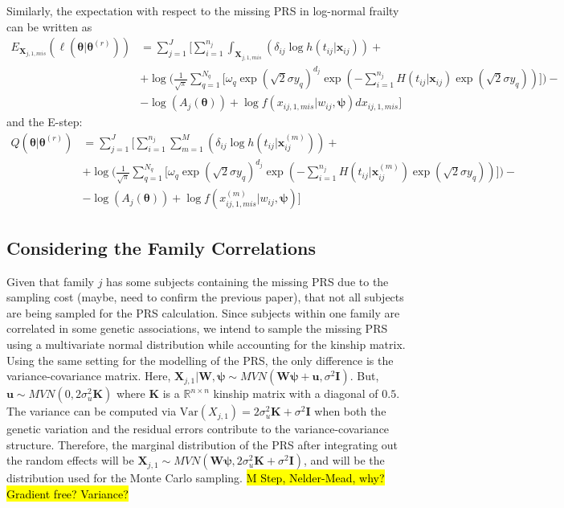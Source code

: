 \documentclass[preprint,12pt]{elsarticle}
\begin{document}
Similarly, the expectation with respect to the missing PRS in log-normal frailty can be written as
\begin{align} 
    E_{\mathbf{X}_{j,1,mis}}(\ell(\boldsymbol{\theta}|\boldsymbol{\theta}^{(r)}))&=\sum_{j=1}^J\Bigg [\sum_{i=1}^{n_j}\int_{\boldsymbol{X}_{j,1,mis}}(\delta_{ij}\log h(t_{ij}|\mathbf{x}_{ij}))+ \\ 
    & + \log\Big (\frac{1}{\sqrt{\pi}}\sum_{q=1}^{N_{q}}\Big [\omega_{q}\exp (\sqrt{2}\sigma y_{q})^{d_j}\exp (-\sum_{i=1}^{n_j}H(t_{ij}|\mathbf{x}_{ij})\exp(\sqrt{2}\sigma y_{q}))\Big]\Big ) - \\
    & - \log(A_j(\boldsymbol{\theta})) + \log f(x_{ij,1,mis}|w_{ij},\boldsymbol{\psi}) dx_{ij,1,mis}\Bigg ]
\end{align}
and the E-step:
\begin{align} 
    Q(\boldsymbol{\theta}|\boldsymbol{\theta}^{(r)}) &= \sum_{j=1}^J\Bigg [\sum_{i=1}^{n_j}\sum_{m=1}^{M}(\delta_{ij}\log h(t_{ij}|\mathbf{x}^{(m)}_{ij}))+ \\ 
    & + \log\Big (\frac{1}{\sqrt{\pi}}\sum_{q=1}^{N_{q}}\Big [\omega_{q}\exp (\sqrt{2}\sigma y_{q})^{d_j}\exp (-\sum_{i=1}^{n_j}H(t_{ij}|\mathbf{x}^{(m)}_{ij})\exp(\sqrt{2}\sigma y_{q}))\Big]\Big ) - \\
    & - \log(A_j(\boldsymbol{\theta})) + \log f(x_{ij,1,mis}^{(m)}|w_{ij},\boldsymbol{\psi})\Bigg ]
\end{align}
\subsection{Considering the Family Correlations}
Given that family $j$ has some subjects containing the missing PRS due to the sampling cost (maybe, need to confirm the previous paper), that not all subjects are being sampled for the PRS calculation. 
Since subjects within one family are correlated in some genetic associations, we intend to sample the missing PRS using a multivariate normal distribution while accounting for the kinship matrix. 
Using the same setting for the modelling of the PRS, the only difference is the variance-covariance matrix. 
Here, $\mathbf{X}_{j,1}|\mathbf{W},\boldsymbol{\psi}\sim MVN(\mathbf{W}\boldsymbol{\psi}+\mathbf{u}, \sigma^2\mathbf{I})$. 
But, $\mathbf{u}\sim MVN(0, 2\sigma^2_u\mathbf{K})$ where $\mathbf{K}$ is a $\mathbb{R}^{n\times n}$ kinship matrix with a diagonal of $0.5$. 
The variance can be computed via $\text{Var}(X_{j,1})=2\sigma_u^2\mathbf{K}+\sigma^2\mathbf{I}$ when both the genetic variation and the residual errors contribute to the variance-covariance structure. 
Therefore, the marginal distribution of the PRS after integrating out the random effects will be $\mathbf{X}_{j,1}\sim MVN(\mathbf{W}\boldsymbol{\psi}, 2\sigma_u^2\mathbf{K}+\sigma^2\mathbf{I})$, and will be the distribution used for the Monte Carlo sampling.
\hl{M Step, Nelder-Mead, why? Gradient free? Variance?}
\end{document}
